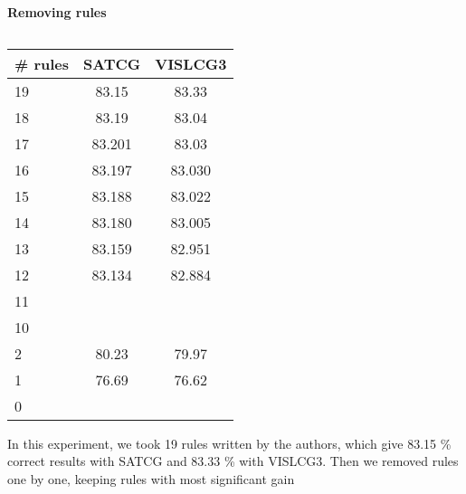 \documentclass[11pt]{article}
\newcommand{\todo}[1]{{\color{cyan}\textbf{[TODO: }#1\textbf{]}}}
\begin{document}


\paragraph{Removing rules}
\begin{table}
  \centering
  \begin{tabular}{|l|c|c|}
     \hline
    \textbf{\# rules} & \textbf{SATCG} & \textbf{VISLCG3} \\
    \hline 
	19 &  83.15 & 83.33 \\ \hline  %
	18 &  83.19 & 83.04 \\ \hline  %
	17 &  83.201 & 83.03 \\ \hline   %
	16 &  83.197 & 83.030 \\ \hline  %
	15 &  83.188 & 83.022\\ \hline  %
	14 &  83.180 & 83.005 \\ \hline  %
	13 &  83.159 & 82.951 \\ \hline  %
	12 &  83.134 & 82.884\\ \hline  %
	11 &  & \\ \hline  
	10 &  & \\ \hline  
	2   & 80.23 & 79.97 \\ \hline
	1   & 76.69 & 76.62 \\ \hline
	0   & &  \\ \hline
  \end{tabular}
  \caption{}
  \label{table:results}
\end{table}
In this experiment, we took 19 rules written by the authors, which give 83.15 \% correct results with SATCG and 83.33 \% with VISLCG3.
Then we removed rules one by one, keeping rules with most significant gain 
\end{document}
